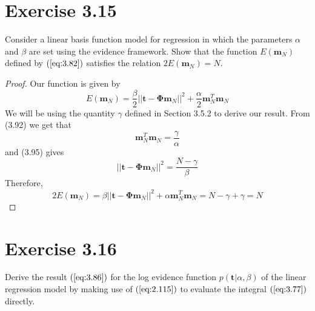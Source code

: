 \section*{Exercise 3.15}
Consider a linear basis function model for regression in which the parameters
$\alpha$ and $\beta$ are set using the evidence framework. Show that the
function $E(\mathbf{m}_N)$ defined by $(\ref{eq:3.82})$ satisfies the relation
$2E(\mathbf{m}_N) = N$.

\vspace{1em}

\begin{proof}
    Our function is given by
    \begin{equation}\label{eq:3.82}\tag{3.82}
        E(\mathbf{m}_N) = \frac{\beta}{2} ||\mathbf{t} - \mathbf{\Phi}\mathbf{m}_N||^2
        + \frac{\alpha}{2} \mathbf{m}_N^T\mathbf{m}_N
    \end{equation}
    We will be using the quantity $\gamma$ defined in Section 3.5.2 to 
    derive our result. From (3.92) we get that
     \[
         \mathbf{m}_N^T\mathbf{m}_N = \frac{\gamma}{\alpha}
    \] 
    and (3.95) gives
    \[
        ||\mathbf{t} - \mathbf{\Phi}\mathbf{m}_N||^2 = \frac{N - \gamma}{\beta}
    \] 
    Therefore,
    \[
        2E(\mathbf{m}_N) 
        = \beta||\mathbf{t} - \mathbf{\Phi}\mathbf{m}_N||^2 + \alpha\mathbf{m}_N^T\mathbf{m}_N
        = N - \gamma + \gamma = N
    \] 
\end{proof}

\section*{Exercise 3.16}
Derive the result $(\ref{eq:3.86})$ for the log evidence
function $p(\mathbf{t} | \alpha, \beta)$ of the linear
regression model by making use of $(\ref{eq:2.115})$ to
evaluate the integral $(\ref{eq:3.77})$ directly.

\vspace{1em}

